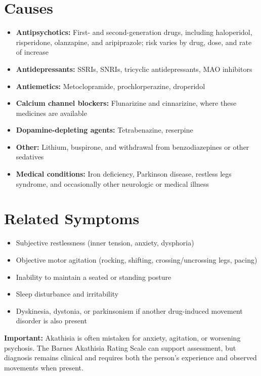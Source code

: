 \section*{Causes}
\begin{itemize}
 \item \textbf{Antipsychotics:} First- and second-generation drugs, including haloperidol, risperidone, olanzapine, and aripiprazole; risk varies by drug, dose, and rate of increase
 \item \textbf{Antidepressants:} SSRIs, SNRIs, tricyclic antidepressants, MAO inhibitors
 \item \textbf{Antiemetics:} Metoclopramide, prochlorperazine, droperidol
 \item \textbf{Calcium channel blockers:} Flunarizine and cinnarizine, where these medicines are available
 \item \textbf{Dopamine-depleting agents:} Tetrabenazine, reserpine
 \item \textbf{Other:} Lithium, buspirone, and withdrawal from benzodiazepines or other sedatives
 \item \textbf{Medical conditions:} Iron deficiency, Parkinson disease, restless legs syndrome, and occasionally other neurologic or medical illness
\end{itemize}

\section*{Related Symptoms}
\begin{itemize}
 \item Subjective restlessness (inner tension, anxiety, dysphoria)
 \item Objective motor agitation (rocking, shifting, crossing/uncrossing legs, pacing)
 \item Inability to maintain a seated or standing posture
 \item Sleep disturbance and irritability
 \item Dyskinesia, dystonia, or parkinsonism if another drug-induced movement disorder is also present
\end{itemize}
\textbf{Important:} Akathisia is often mistaken for anxiety, agitation, or worsening psychosis. The Barnes Akathisia Rating Scale can support assessment, but diagnosis remains clinical and requires both the person's experience and observed movements when present.

